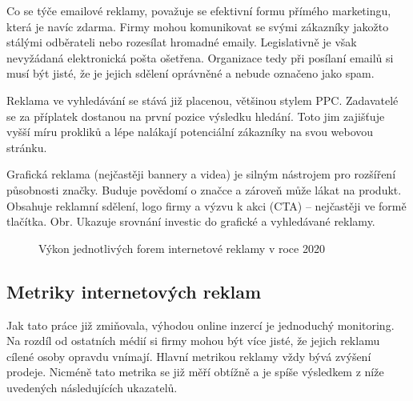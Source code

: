Co se týče emailové reklamy, považuje se efektivní formu přímého marketingu, která je navíc zdarma.
Firmy mohou komunikovat se svými zákazníky jakožto stálými odběrateli nebo rozesílat hromadné emaily. Legislativně je však nevyžádaná elektronická pošta ošetřena.
Organizace tedy při posílaní emailů si musí být jisté, že je jejich sdělení oprávněné a nebude označeno jako spam.

Reklama ve vyhledávání se stává již placenou, většinou stylem PPC. Zadavatelé se za příplatek dostanou na první pozice výsledku hledání.
Toto jim zajišťuje vyšší míru prokliků a lépe nalákají potenciální zákazníky na svou webovou stránku. 

Grafická reklama (nejčastěji bannery a videa) je silným nástrojem pro rozšíření působnosti značky. Buduje povědomí o značce a
zároveň může lákat na produkt. Obsahuje reklamní sdělení, logo firmy a výzvu k akci (CTA) -- nejčastěji ve formě tlačítka.
Obr. Ukazuje srovnání investic do grafické a vyhledávané reklamy.

\begin{figure}[h]
    \centering
    \caption[Výkon reklam v roce 2020]{Výkon jednotlivých forem internetové reklamy v roce 2020 \cite{spir:mediatypes}}
    \label{fig:spir-ad-performance}
    
\end{figure}

    \subsection{Metriky internetových reklam}\label{ssec:online-ad-metrics}
    Jak tato práce již zmiňovala, výhodou online inzercí je jednoduchý monitoring. Na rozdíl od ostatních médií si firmy mohou být více jisté,
    že jejich reklamu cílené osoby opravdu vnímají. Hlavní metrikou reklamy vždy bývá zvýšení prodeje.
    Nicméně tato metrika se již měří obtížně a je spíše výsledkem z níže uvedených následujících ukazatelů.

